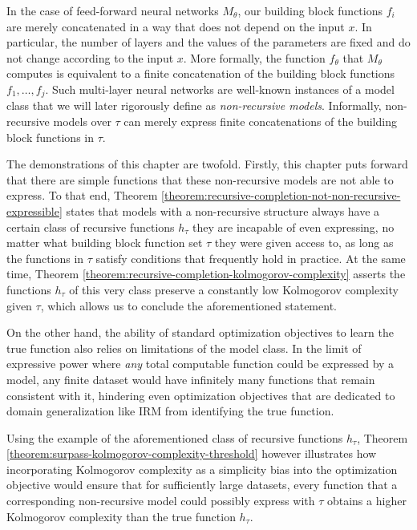 In the case of feed-forward neural networks $M_\theta$, our building block functions $f_i$ are merely concatenated in a way that does not depend on the input $x$.
In particular, the number of layers and the values of the parameters are fixed and do not change according to the input $x$.
More formally, the function $f_{\theta}$ that $M_\theta$ computes is equivalent to a finite concatenation of the building block functions $f_1,\dots,f_j$.
Such multi-layer neural networks are well-known instances of a model class that we will later rigorously define as \textit{non-recursive models}.
Informally, non-recursive models over $\tau$ can merely express finite concatenations of the building block functions in $\tau$.

The demonstrations of this chapter are twofold.
Firstly, this chapter puts forward that there are simple functions that these non-recursive models are not able to express.
To that end, Theorem \ref{theorem:recursive-completion-not-non-recursive-expressible} states that models with a non-recursive structure always have a certain class of recursive functions $h_{\tau}$ they are incapable of even expressing, no matter what building block function set $\tau$ they were given access to, as long as the functions in $\tau$ satisfy conditions that frequently hold in practice. 
At the same time, Theorem \ref{theorem:recursive-completion-kolmogorov-complexity} asserts the functions $h_{\tau}$ of this very class preserve a constantly low Kolmogorov complexity given $\tau$, which allows us to conclude the aforementioned statement.

On the other hand, the ability of standard optimization objectives to learn the true function also relies on limitations of the model class.
In the limit of expressive power where \textit{any} total computable function could be expressed by a model, any finite dataset would have infinitely many functions that remain consistent with it, hindering even optimization objectives that are dedicated to domain generalization like IRM from identifying the true function.

Using the example of the aforementioned class of recursive functions $h_\tau$, Theorem \ref{theorem:surpass-kolmogorov-complexity-threshold} however illustrates how incorporating Kolmogorov complexity as a simplicity bias into the optimization objective would ensure that for sufficiently large datasets, every function that a corresponding non-recursive model could possibly express with $\tau$ obtains a higher Kolmogorov complexity than the true function $h_\tau$.

